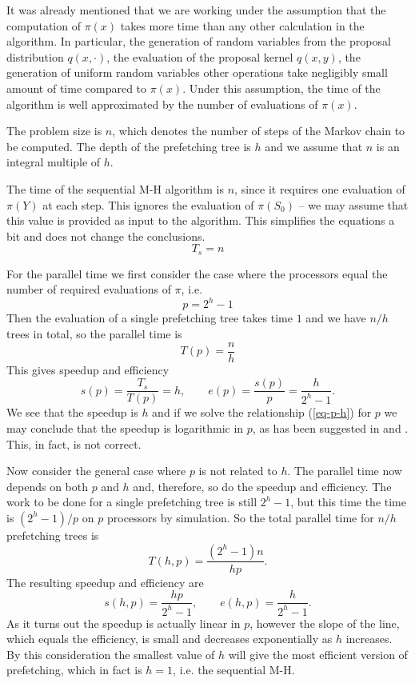 \documentclass[11pt,letterpaper]{article}       %
\begin{document}
It was already mentioned that we are working under the assumption that the
computation of $\pi(x)$ takes more time than any other calculation in the
algorithm.  In particular, the generation of random variables from the proposal
distribution $q(x,\cdot)$, the evaluation of the proposal kernel $q(x,y)$, the
generation of uniform random variables other operations take negligibly small
amount of time compared to $\pi(x)$.  Under this assumption, the time of the
algorithm is well approximated by the number of evaluations of $\pi(x)$.

The problem size is $n$, which denotes the number of steps of the Markov 
chain to be computed.  The depth of the prefetching tree is $h$ and we
assume that $n$ is an integral multiple of $h$.

The time of the sequential M-H algorithm is $n$, since it requires one
evaluation of $\pi(Y)$ at each step.  This ignores the evaluation of $\pi(S_0)$
-- we may assume that this value is provided as input to the algorithm.  This
simplifies the equations a bit and does not change the conclusions.
\begin{equation}
T_s = n
\end{equation}

For the parallel time we first consider the case where the processors equal the number of required evaluations of $\pi$, i.e. 
\begin{equation}
p=2^h-1
\label{eq-p-h}
\end{equation}
Then the evaluation of a single prefetching tree takes time $1$ and we have $n/h$ trees in total, so
the parallel time is
\begin{equation}
T(p) = \frac{n}{h}
\end{equation}
This gives speedup and efficiency
\begin{equation}
s(p) = \frac{T_s}{T(p)} = h,  \qquad e(p) = \frac{s(p)}{p} = \frac{h}{2^h-1}.
\end{equation}
We see that the speedup is $h$ and if we solve the relationship (\ref{eq-p-h})
for $p$ we may conclude that the speedup is logarithmic in $p$, as has been
suggested in  \cite{brockwell2006parallel} and \cite{strid2010efficient}.  This, in fact,
is not correct.  

Now consider the general case where $p$ is not related to $h$.  The parallel time 
now depends on both $p$ and $h$ and, therefore, so do the speedup and efficiency.
The work to be done for a single prefetching tree 
is still $2^h-1$, but this time the time is $(2^h-1)/p$ on $p$ processors by simulation.
So the total parallel time for $n/h$ prefetching trees is
\begin{equation}
T(h,p) = \frac{(2^h-1)n}{hp}.
\end{equation}
The resulting speedup and efficiency are
\begin{equation}
s(h,p) = \frac{hp}{2^h-1}, \qquad e(h,p) = \frac{h}{2^h-1}.
\end{equation}
As it turns out the speedup is actually linear in $p$, however the slope of the
line, which equals the efficiency, is small and decreases exponentially as $h$
increases.  By this consideration the smallest value of $h$ will give the most
efficient version of prefetching, which in fact is $h=1$, i.e. the sequential
M-H. 
\end{document}

